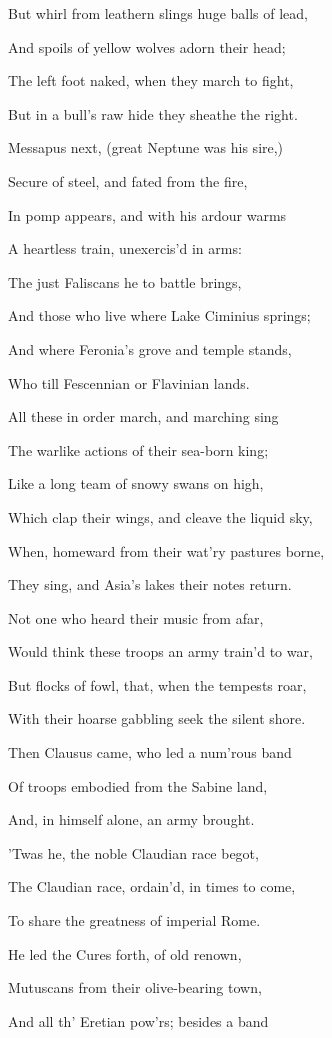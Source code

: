 But whirl from leathern slings huge balls of lead,

And spoils of yellow wolves adorn their head;

The left foot naked, when they march to fight,

But in a bull’s raw hide they sheathe the right.

Messapus next, (great Neptune was his sire,)

Secure of steel, and fated from the fire,

In pomp appears, and with his ardour warms

A heartless train, unexercis’d in arms:

The just Faliscans he to battle brings,

And those who live where Lake Ciminius springs;

And where Feronia’s grove and temple stands,

Who till Fescennian or Flavinian lands.

All these in order march, and marching sing

The warlike actions of their sea-born king;

Like a long team of snowy swans on high,

Which clap their wings, and cleave the liquid sky,

When, homeward from their wat’ry pastures borne,

They sing, and Asia’s lakes their notes return.

Not one who heard their music from afar,

Would think these troops an army train’d to war,

But flocks of fowl, that, when the tempests roar,

With their hoarse gabbling seek the silent shore.

Then Clausus came, who led a num’rous band

Of troops embodied from the Sabine land,

And, in himself alone, an army brought.

’Twas he, the noble Claudian race begot,

The Claudian race, ordain’d, in times to come,

To share the greatness of imperial Rome.

He led the Cures forth, of old renown,

Mutuscans from their olive-bearing town,

And all th’ Eretian pow’rs; besides a band

